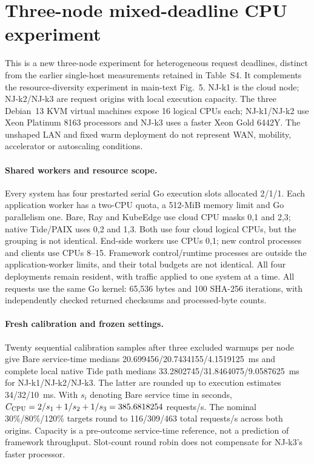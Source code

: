 \section*{Three-node mixed-deadline CPU experiment}
\label{sec:three-node-mixed}
This is a new three-node experiment for heterogeneous request deadlines, distinct from the earlier single-host measurements retained in Table~S4. It complements the resource-diversity experiment in main-text Fig.~5. NJ-k1 is the cloud node; NJ-k2/NJ-k3 are request origins with local execution capacity. The three Debian~13 KVM virtual machines expose 16 logical CPUs each; NJ-k1/NJ-k2 use Xeon Platinum 8163 processors and NJ-k3 uses a faster Xeon Gold 6442Y. The unshaped LAN and fixed warm deployment do not represent WAN, mobility, accelerator or autoscaling conditions.

\paragraph{Shared workers and resource scope.}
Every system has four prestarted serial Go execution slots allocated 2/1/1. Each application worker has a two-CPU quota, a 512-MiB memory limit and Go parallelism one. Bare, Ray and KubeEdge use cloud CPU masks 0,1 and 2,3; native Tide/PAIX uses 0,2 and 1,3. Both use four cloud logical CPUs, but the grouping is not identical. End-side workers use CPUs 0,1; new control processes and clients use CPUs 8--15. Framework control/runtime processes are outside the application-worker limits, and their total budgets are not identical. All four deployments remain resident, with traffic applied to one system at a time. All requests use the same Go kernel: 65,536 bytes and 100 SHA-256 iterations, with independently checked returned checksums and processed-byte counts.

\paragraph{Fresh calibration and frozen settings.}
Twenty sequential calibration samples after three excluded warmups per node give Bare service-time medians 20.699456/20.7434155/4.1519125~ms and complete local native Tide path medians 33.2802745/31.8464075/9.0587625~ms for NJ-k1/NJ-k2/NJ-k3. The latter are rounded up to execution estimates 34/32/10~ms. With $s_i$ denoting Bare service time in seconds, $C_{\rm CPU}=2/s_1+1/s_2+1/s_3=385.6818254$ requests/s. The nominal 30\%/80\%/120\% targets round to 116/309/463 total requests/s across both origins. Capacity is a pre-outcome service-time reference, not a prediction of framework throughput. Slot-count round robin does not compensate for NJ-k3's faster processor.

